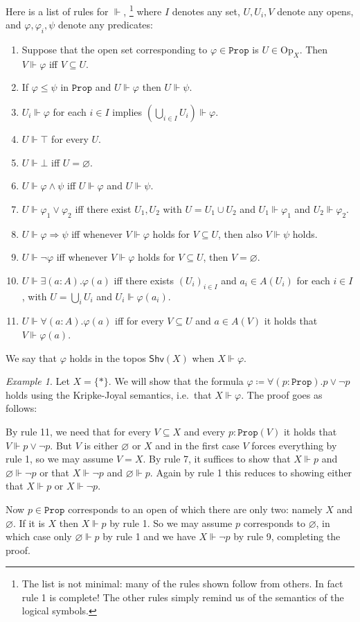 \documentclass[11pt, oneside, article]{memoir}
\theoremstyle{plain}
\theoremstyle{definition}
\theoremstyle{remark}
\newtheorem{example}[theorem]{Example}
\renewcommand{\ss}{\subseteq}
\newcommand{\const}[1]{\mathtt{#1}}
\newcommand{\Set}[1]{\mathrm{#1}}
\newcommand{\Fun}[1]{\mathsf{#1}}
\newcommand{\forces}{\Vdash}
\newcommand{\shv}{\Fun{Shv}}
\newcommand{\prop}{\const{Prop}}
\newcommand{\Op}{\Set{Op}}
\newcommand{\imp}{\Rightarrow}
\newcommand{\true}{\top}
\newcommand{\false}{\bot}
\begin{document}
Here is a list of rules for $\forces$,%
\footnote{The list is not minimal: many of the rules shown follow from others. In fact rule 1 is complete! The other rules simply remind us of the semantics of the logical symbols.
}
where $I$ denotes any set, $U, U_i, V$ denote any opens, and $\varphi,\varphi_i,\psi$ denote any predicates:
\begin{enumerate}
	\item Suppose that the open set corresponding to $\varphi\in\prop$ is $U\in\Op_X$. Then $V\forces\varphi$ iff $V\ss U$.
  \item If $\varphi\leq\psi$ in $\prop$ and $U\forces\varphi$ then $U\forces\psi$.
  \item $U_i\forces\varphi$ for each $i\in I$ implies $\left(\bigcup_{i\in I}U_i\right)\forces\varphi$.
  \item $U\forces\true$ for every $U$.
  \item $U\forces\false$ iff $U=\varnothing$.
  \item $U\forces\varphi\wedge\psi$ iff $U\forces\varphi$ and $U\forces\psi$.
  \item $U\forces\varphi_1\vee\varphi_2$ iff there exist $U_1,U_2$ with $U=U_1\cup U_2$ and $U_1\forces\varphi_1$ and $U_2\forces\varphi_2$.
  \item $U\forces \varphi\imp\psi$ iff whenever $V\forces\varphi$ holds for $V\ss U$, then also $V\forces\psi$ holds.
  \item $U\forces\neg\varphi$ iff whenever $V\forces\varphi$ holds for $V\ss U$, then $V=\varnothing$.
  \item $U\forces\exists (a:A).\varphi(a)$ iff there exists $(U_i)_{i\in I}$ and $a_i\in A(U_i)$ for each $i\in I$, with $U=\bigcup_iU_i$ and $U_i\forces\varphi(a_i)$.
  \item $U\forces\forall (a:A).\varphi(a)$ iff for every $V\ss U$ and $a\in A(V)$ it holds that $V\forces \varphi(a)$.
\end{enumerate}
We say that $\varphi$ holds in the topos $\shv(X)$ when $X\forces\varphi$.


\begin{example}
Let $X=\{*\}$. We will show that the formula $\varphi\coloneqq\forall (p:\prop).p\vee\neg p$ holds using the Kripke-Joyal semantics, i.e.\ that $X\forces\varphi$. The proof goes as follows:

By rule 11, we need that for every $V\ss X$ and every $p:\prop(V)$ it holds that $V\forces p\vee\neg p$. But $V$ is either $\varnothing$ or $X$ and in the first case $V$ forces everything by rule 1, so we may assume $V=X$. By rule 7, it suffices to show that $X\forces p$ and $\varnothing\forces\neg p$ or that $X\forces\neg p$ and $\varnothing\forces p$. Again by rule 1 this reduces to showing either that $X\forces p$ or $X\forces\neg p$.

Now $p\in\prop$ corresponds to an open of which there are only two: namely $X$ and $\varnothing$. If it is $X$ then $X\forces p$ by rule 1. So we may assume $p$ corresponds to $\varnothing$, in which case only $\varnothing\forces p$ by rule 1 and we have $X\forces\neg p$ by rule 9, completing the proof.
\end{example}
\end{document}
